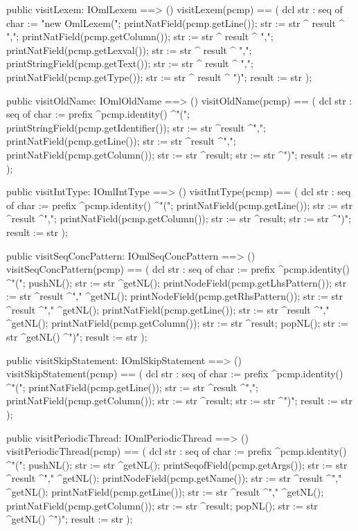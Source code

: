 \begin{vdm_al}
  public visitLexem: IOmlLexem ==> ()
  visitLexem(pcmp) ==
    ( dcl str : seq of char := "new OmlLexem(";
      printNatField(pcmp.getLine());
      str := str ^ result ^ ",";
      printNatField(pcmp.getColumn());
      str := str ^ result ^ ",";
      printNatField(pcmp.getLexval());
      str := str ^ result ^ ",";
      printStringField(pcmp.getText());
      str := str ^ result ^ ",";
      printNatField(pcmp.getType());
      str := str ^ result ^ ")";
      result := str );

  public visitOldName: IOmlOldName ==> ()
  visitOldName(pcmp) ==
    ( dcl str : seq of char := prefix ^pcmp.identity() ^"(";
      printStringField(pcmp.getIdentifier());
      str := str ^result ^",";
      printNatField(pcmp.getLine());
      str := str ^result ^",";
      printNatField(pcmp.getColumn());
      str := str ^result;
      str := str ^")";
      result := str );

  public visitIntType: IOmlIntType ==> ()
  visitIntType(pcmp) ==
    ( dcl str : seq of char := prefix ^pcmp.identity() ^"(";
      printNatField(pcmp.getLine());
      str := str ^result ^",";
      printNatField(pcmp.getColumn());
      str := str ^result;
      str := str ^")";
      result := str );

  public visitSeqConcPattern: IOmlSeqConcPattern ==> ()
  visitSeqConcPattern(pcmp) ==
    ( dcl str : seq of char := prefix ^pcmp.identity() ^"(";
      pushNL();
      str := str ^getNL();
      printNodeField(pcmp.getLhsPattern());
      str := str ^result ^"," ^getNL();
      printNodeField(pcmp.getRhsPattern());
      str := str ^result ^"," ^getNL();
      printNatField(pcmp.getLine());
      str := str ^result ^"," ^getNL();
      printNatField(pcmp.getColumn());
      str := str ^result;
      popNL();
      str := str ^getNL() ^")";
      result := str );

  public visitSkipStatement: IOmlSkipStatement ==> ()
  visitSkipStatement(pcmp) ==
    ( dcl str : seq of char := prefix ^pcmp.identity() ^"(";
      printNatField(pcmp.getLine());
      str := str ^result ^",";
      printNatField(pcmp.getColumn());
      str := str ^result;
      str := str ^")";
      result := str );

  public visitPeriodicThread: IOmlPeriodicThread ==> ()
  visitPeriodicThread(pcmp) ==
    ( dcl str : seq of char := prefix ^pcmp.identity() ^"(";
      pushNL();
      str := str ^getNL();
      printSeqofField(pcmp.getArgs());
      str := str ^result ^"," ^getNL();
      printNodeField(pcmp.getName());
      str := str ^result ^"," ^getNL();
      printNatField(pcmp.getLine());
      str := str ^result ^"," ^getNL();
      printNatField(pcmp.getColumn());
      str := str ^result;
      popNL();
      str := str ^getNL() ^")";
      result := str );


\end{vdm_al}
